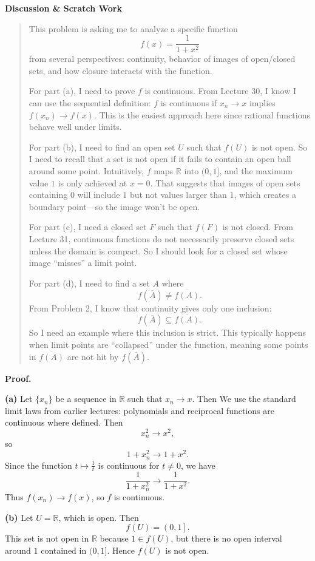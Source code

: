 \documentclass[12pt]{article}
\newenvironment{scratch}{%
  \par\smallskip
  \noindent\textbf{Discussion \& Scratch Work}\begin{quote}\small
}{%
  \end{quote}\smallskip
}
\begin{document}
\begin{scratch}
This problem is asking me to analyze a specific function
\[
f(x)=\frac{1}{1+x^2}
\]
from several perspectives: continuity, behavior of images of open/closed sets, and how closure interacts with the function.

For part (a), I need to prove $f$ is continuous. From Lecture 30, I know I can use the sequential definition: $f$ is continuous if $x_n\to x$ implies $f(x_n)\to f(x)$. This is the easiest approach here since rational functions behave well under limits.

For part (b), I need to find an open set $U$ such that $f(U)$ is not open. So I need to recall that a set is not open if it fails to contain an open ball around some point. Intuitively, $f$ maps $\mathbb{R}$ into $(0,1]$, and the maximum value $1$ is only achieved at $x=0$. That suggests that images of open sets containing $0$ will include $1$ but not values larger than $1$, which creates a boundary point—so the image won’t be open.

For part (c), I need a closed set $F$ such that $f(F)$ is not closed. From Lecture 31, continuous functions do not necessarily preserve closed sets unless the domain is compact. So I should look for a closed set whose image “misses” a limit point.

For part (d), I need to find a set $A$ where
\[
f(\overline{A}) \neq \overline{f(A)}.
\]
From Problem 2, I know that continuity gives only one inclusion:
\[
f(\overline{A}) \subseteq \overline{f(A)}.
\]
So I need an example where this inclusion is strict. This typically happens when limit points are “collapsed” under the function, meaning some points in $\overline{f(A)}$ are not hit by $f(\overline{A})$.
\end{scratch}

\textbf{Proof.}

\textbf{(a)} Let $\{x_n\}$ be a sequence in $\mathbb{R}$ such that $x_n \to x$. Then
We use the standard limit laws from earlier lectures: polynomials and reciprocal functions are continuous where defined. Then
\[
x_n^2 \to x^2,
\]
so
\[
1+x_n^2 \to 1+x^2.
\]
Since the function $t \mapsto \frac{1}{t}$ is continuous for $t\neq 0$, we have
\[
\frac{1}{1+x_n^2} \to \frac{1}{1+x^2}.
\]
Thus $f(x_n)\to f(x)$, so $f$ is continuous.

\textbf{(b)} Let $U=\mathbb{R}$, which is open. Then
\[
f(U)=\left(0,1\right].
\]
This set is not open in $\mathbb{R}$ because $1\in f(U)$, but there is no open interval around $1$ contained in $(0,1]$. Hence $f(U)$ is not open.
\end{document}
